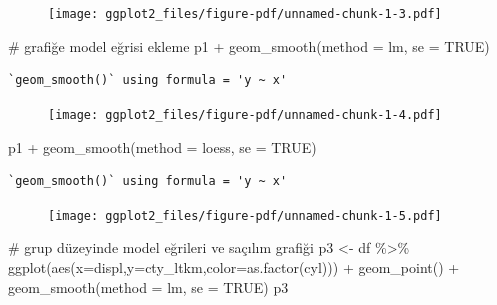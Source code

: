 \documentclass[
  letterpaper,
  DIV=11,
  numbers=noendperiod]{scrreprt}
\newenvironment{Shaded}{\begin{snugshade}}{\end{snugshade}}
\newcommand{\AttributeTok}[1]{\textcolor[rgb]{0.40,0.45,0.13}{#1}}
\newcommand{\CommentTok}[1]{\textcolor[rgb]{0.37,0.37,0.37}{#1}}
\newcommand{\ConstantTok}[1]{\textcolor[rgb]{0.56,0.35,0.01}{#1}}
\newcommand{\FunctionTok}[1]{\textcolor[rgb]{0.28,0.35,0.67}{#1}}
\newcommand{\NormalTok}[1]{\textcolor[rgb]{0.00,0.23,0.31}{#1}}
\newcommand{\OtherTok}[1]{\textcolor[rgb]{0.00,0.23,0.31}{#1}}
\newcommand{\SpecialCharTok}[1]{\textcolor[rgb]{0.37,0.37,0.37}{#1}}
\begin{document}
\begin{figure}[H]

{\centering \texttt{[image: ggplot2\_files/figure-pdf/unnamed-chunk-1-3.pdf]}

}

\end{figure}

\begin{Shaded}
\begin{Highlighting}[]
\CommentTok{\# grafiğe model eğrisi ekleme}
\NormalTok{p1 }\SpecialCharTok{+} \FunctionTok{geom\_smooth}\NormalTok{(}\AttributeTok{method =}\NormalTok{ lm, }\AttributeTok{se =} \ConstantTok{TRUE}\NormalTok{)}
\end{Highlighting}
\end{Shaded}

\begin{verbatim}
`geom_smooth()` using formula = 'y ~ x'
\end{verbatim}

\begin{figure}[H]

{\centering \texttt{[image: ggplot2\_files/figure-pdf/unnamed-chunk-1-4.pdf]}

}

\end{figure}

\begin{Shaded}
\begin{Highlighting}[]
\NormalTok{p1 }\SpecialCharTok{+} \FunctionTok{geom\_smooth}\NormalTok{(}\AttributeTok{method =}\NormalTok{ loess, }\AttributeTok{se =} \ConstantTok{TRUE}\NormalTok{)}
\end{Highlighting}
\end{Shaded}

\begin{verbatim}
`geom_smooth()` using formula = 'y ~ x'
\end{verbatim}

\begin{figure}[H]

{\centering \texttt{[image: ggplot2\_files/figure-pdf/unnamed-chunk-1-5.pdf]}

}

\end{figure}

\begin{Shaded}
\begin{Highlighting}[]
\CommentTok{\# grup düzeyinde model eğrileri ve saçılım grafiği}
\NormalTok{p3 }\OtherTok{\textless{}{-}}\NormalTok{ df }\SpecialCharTok{\%\textgreater{}\%} 
  \FunctionTok{ggplot}\NormalTok{(}\FunctionTok{aes}\NormalTok{(}\AttributeTok{x=}\NormalTok{displ,}\AttributeTok{y=}\NormalTok{cty\_ltkm,}\AttributeTok{color=}\FunctionTok{as.factor}\NormalTok{(cyl))) }\SpecialCharTok{+}
  \FunctionTok{geom\_point}\NormalTok{()  }\SpecialCharTok{+} 
  \FunctionTok{geom\_smooth}\NormalTok{(}\AttributeTok{method =}\NormalTok{ lm, }\AttributeTok{se =} \ConstantTok{TRUE}\NormalTok{)}
\NormalTok{p3}
\end{Highlighting}
\end{Shaded}
\end{document}
